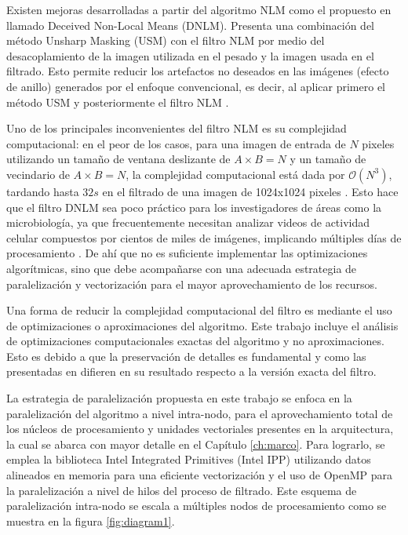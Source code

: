 Existen mejoras desarrolladas a partir del algoritmo NLM como el propuesto en \cite{calderon2015dewaff} llamado Deceived Non-Local Means (DNLM). Presenta una combinaci\'on del m\'etodo Unsharp Masking (USM) con el filtro NLM por medio del desacoplamiento de la imagen utilizada en el pesado y la imagen usada en el filtrado. Esto permite reducir los artefactos no deseados en las im\'agenes (efecto de anillo) generados por el enfoque convencional, es decir, al aplicar primero el m\'etodo USM y posteriormente el filtro NLM \cite{calderon2015dewaff}.  

Uno de los principales inconvenientes del filtro NLM es su complejidad computacional: en el peor de los casos, para una imagen de entrada de $N$ pixeles utilizando un tamaño de ventana deslizante de $A\times B = N$ y un tamaño de vecindario de $A\times B = N$, la complejidad computacional est\'a dada por $\mathcal{O}(N^{3})$, tardando hasta $32s$ en el filtrado de una imagen de 1024x1024 pixeles \cite{Zhu2016}. Esto hace que el filtro DNLM sea poco pr\'actico para los investigadores de \'areas como la microbiolog\'ia, ya que frecuentemente necesitan analizar videos de actividad celular compuestos por cientos de miles de im\'agenes, implicando m\'ultiples d\'ias de procesamiento  \cite{Yang2006NucleiSU, cellsegmentationMarkov, Tay2010, Fils_BfilCells_2008}. De ah\'i que no es suficiente implementar las optimizaciones algor\'itmicas, sino que debe acompa\~narse con una adecuada estrategia de paralelizaci\'on y vectorizaci\'on para el mayor aprovechamiento de los recursos.

Una forma de reducir la complejidad computacional del filtro es mediante el uso de optimizaciones o aproximaciones del algoritmo. Este trabajo incluye el an\'alisis de optimizaciones computacionales exactas del algoritmo y no aproximaciones. Esto es debido a que la preservaci\'on de detalles es fundamental y como las presentadas en \cite{Orchard2008,Tasdizen2009} difieren en su resultado respecto a la versi\'on exacta del filtro. 

La estrategia de paralelizaci\'on propuesta en este trabajo se enfoca en la paralelizaci\'on del algoritmo a nivel intra-nodo, para el aprovechamiento total de los n\'ucleos de procesamiento y unidades vectoriales presentes en la arquitectura, la cual se abarca con mayor detalle en el Cap\'itulo \ref{ch:marco}. Para lograrlo, se emplea la biblioteca Intel Integrated Primitives (Intel IPP) utilizando datos alineados en memoria para una eficiente vectorizaci\'on y el uso de OpenMP para la paralelizaci\'on a nivel de hilos del proceso de filtrado. Este esquema de paralelizaci\'on intra-nodo se escala a m\'ultiples nodos de procesamiento como se muestra en la figura \ref{fig:diagram1}.


